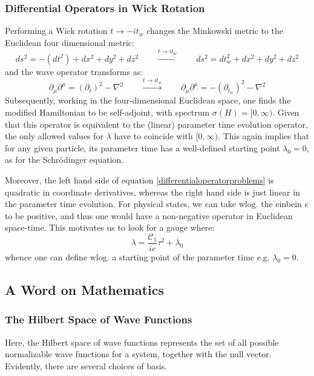 \documentclass[twoside,a4paper,11pt]{article}
\numberwithin{equation}{section}
\begin{document}
\subsubsection{Differential Operators in Wick Rotation}
Performing a Wick rotation $t \to -it_w$ changes the Minkowski metric to the Euclidean four dimensional metric:
\begin{equation}
ds^{2}=-(dt^{2})+dx^{2}+dy^{2}+dz^{2} \qquad \xrightarrow{t \to it_w}  \qquad  ds^{2}=d t_w ^{2}+dx^{2}+dy^{2}+dz^{2}
\end{equation}
and the wave operator transforms as:
\begin{equation}
    \partial_\mu \partial^\mu = (\partial_t)^2 - \nabla^2 \qquad  \xrightarrow{t \to it_w}  \qquad \partial_\mu\partial^\mu = - (\partial_{t_w})^2 - \nabla^2
\end{equation}
Subsequently, working in the four-dimensional Euclidean space, one finds the modified Hamiltonian to be self-adjoint, with spectrum $\sigma(H) = [0, \infty)$. Given that this operator is equivalent to the (linear) parameter time evolution operator, the only allowed values for $\lambda$ have to coincide with $[0, \infty)$. This again implies that for any given particle, its parameter time has a well-defined starting point $\lambda_0 = 0$, as for the Schr{\"o}dinger equation.  

Moreover, the left hand side of equation \ref{differentialoperatorproblems} is quadratic in coordinate derivatives, whereas the right hand side is just linear in the parameter time evolution. For physical states, we can take wlog. the einbein $e$ to be positive, and thus one would have a non-negative operator in Euclidean space-time. This motivates us to look for a gauge where:
\begin{equation}
    \lambda = \frac{\mathcal{C}_1}{ie } \tau^2 + \lambda_0
    \label{res:diffoperatorrelation}
\end{equation}
whence one can define wlog. a starting point of the parameter time e.g. $\lambda_0 = 0$.




\subsection{A Word on Mathematics}


\subsubsection{The Hilbert Space of Wave Functions}
Here, the Hilbert space of wave functions represents the set of all possible normalizable wave functions for a system, together with the null vector. Evidently,  there are several choices of basis.
\end{document}
